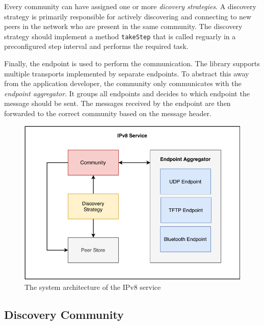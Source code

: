 Every community can have assigned one or more \textit{dicovery strategies}. A discovery strategy is primarily responsible for actively discovering and connecting to new peers in the network who are present in the same community. The discovery strategy should implement a method \texttt{takeStep} that is called reguarly in a preconfigured step interval and performs the required task.

Finally, the endpoint is used to perform the communication. The library supports multiple transports implemented by separate endpoints. To abstract this away from the application developer, the community only communicates with the \textit{endpoint aggregator}. It groups all endpoints and decides to which endpoint the message should be sent. The messages received by the endpoint are then forwarded to the correct community based on the message header.

\begin{figure}
    \includegraphics[width=\textwidth]{diagrams/ipv8-architecture}
    \caption{The system architecture of the IPv8 service}
    \label{ipv8_architecture}
\end{figure}



\subsection{Discovery Community}

